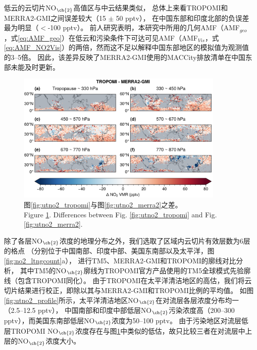 低云的云切片NO$_{\ch{2}}$高值区与中云结果类似，
总体上来看TROPOMI和MERRA2-GMI之间误差较大（15 $\pm$ 50 pptv），
在中国东部和印度北部的负误差最为明显（$<$-100 pptv）。
前人研究表明，本研究中所用的几何AMF（AMF$_{geo}$，式\ref{eq:AMF_geo}）在低云和污染条件下可达可见AMF（AMF$_{Vis}$，式\ref{eq:AMF_NO2Vis}）的两倍\citep{BelmonteRivas.2015}，然而这不足以解释中国东部地区的模拟值为观测值的3--5倍。
因此，该差异反映了MERRA2-GMI使用的MACCity排放清单在中国东部未能及时更新。


\begin{figure}[H]
    \centering
    \includegraphics[width=0.9\textwidth]{./figures/utno2_delta.png}
    \caption{
    图\ref{fig:utno2_tropomi}与图\ref{fig:utno2_merra2}之差。 \\
    Figure \ref{fig:utno2_delta}. Differences between Fig. \ref{fig:utno2_tropomi} and Fig. \ref{fig:utno2_merra2}.
    }
    \label{fig:utno2_delta}
\end{figure}



除了各层NO$_{\ch{2}}$浓度的地理分布之外，我们选取了区域内云切片有效层数为6层的格点
（分别位于中国南部、印度中部、美国东南部以及太平洋，图\ref{fig:no2_ltngcount}a），
进行TM5、MERRA2-GMI和TROPOMI的廓线对比分析，
其中TM5的NO$_{\ch{2}}$廓线为TROPOMI官方产品使用的TM5全球模式先验廓线（包含TROPOMI同化）。
由于TROPOMI在太平洋清洁地区的高估，我们将云切片结果进行校正，即除以其与MERRA2-GMI和TROPOMI比例的平均值。
如图\ref{fig:utno2_profile}所示，太平洋清洁地区NO$_{\ch{2}}$在对流层各层浓度分布均一（2.5--12.5 pptv），
中国南部和印度中部低层NO$_{\ch{2}}$污染浓度高（200--300 pptv），而美国东南部低层NO$_{\ch{2}}$浓度为50--100 pptv。
由于污染地区对流层低层TROPOMI NO$_{\ch{2}}$浓度存在与图\ref{fig:utno2_delta}中类似的低估，故只比较三者在对流层中上层的NO$_{\ch{2}}$浓度大小。


